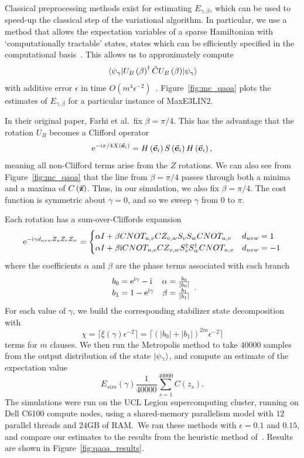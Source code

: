 Classical preprocessing methods exist for estimating $E_{\gamma,\beta}$, which can be used to speed-up the classical step of the variational algorithm. In particular, we use a method that allows the expectation variables of a sparse Hamiltonian with `computationally tractable' states, states which can be efficiently specified in the computational basis~\cite{VandenNest2009}. This allows us to approximately compute
\[\matrixel{\psi_{\gamma}}{U_{B}\left(\beta\right)^{\dagger} \hat{C}U_{B}\left(\beta\right)}{\psi_{\gamma}}\]
with additive error $\epsilon$ in time $O(m^{4}\epsilon^{-2})$~\cite{Bravyi2018}. Figure~\ref{fig:mc_qaoa} plots the estimates of $E_{\gamma,\beta}$ for a particular instance of MaxE3LIN2.\par
In their original paper, Farhi et al.\ fix $\beta=\pi/4$. This has the advantage that the rotation $U_{B}$ becomes a Clifford operator 
\[\mathrm{e}^{-\mathrm{i} \pi/4 X\left(\va{e}_{i}\right)}=H\left(\va{e}_{i}\right)S\left(\va{e}_{i}\right)H\left(\va{e}_{i}\right),\]
meaning all non-Clifford terms arise from the $Z$ rotations. We can also see from Figure~\ref{fig:mc_qaoa} that the line from $\beta=\pi/4$ passes through both a minima and a maxima of $C\left(\va{z}\right)$. Thus, in our simulation, we also fix $\beta=\pi/4$. The cost function is symmetric about $\gamma=0$, and so we sweep $\gamma$ from $0$ to $\pi$.\par
Each rotation has a sum-over-Cliffords expansion~\cite{Bravyi2018}
\[\mathrm{e}^{-\mathrm{i} \gamma d_{uvw}Z_{u}Z_{v}Z_{w}} = \begin{cases}
\alpha I + \beta CNOT_{u,v}CZ_{v,w}S_{v}S_{w}CNOT_{u,v} & d_{uvw} = 1\\
\alpha I + \beta \mathrm{i} CNOT_{u,v}CZ_{v,w}S^{\dagger}_{v}S^{\dagger}_{w}CNOT_{u,v} & d_{uvw} = -1\\
\end{cases}\]
where the coefficients $\alpha$ and $\beta$ are the phase terms associated with each branch
\[\begin{array}{lr}
b_{0} = \mathrm{e}^{\mathrm{i} \gamma}-\mathrm{i} & \alpha = \frac{b_{0}}{\left|b_{0}\right|}\\
b_{1} = 1 - \mathrm{e}^{\mathrm{i} \gamma} & \beta = \frac{b_{1}}{\left|b_{1}\right|}\\
\end{array}.\]
For each value of $\gamma$, we build the corresponding stabilizer state decomposition with
\[\chi = \lceil \xi\left(\gamma\right)\epsilon^{-2}\rceil = \lceil \left(\left|b_{0}\right|+\left|b_{1}\right|\right)^{2m}\epsilon^{-2}\rceil\]
terms for $m$ clauses. We then run the Metropolis method to take $40000$ samples from the output distribution of the state $\ket{\psi_{\gamma}}$, and compute an estimate of the expectation value
\begin{equation}
E_{sim}\left(\gamma\right)\frac{1}{40000}\sum_{s=1}^{40000}C\left(z_{s}\right).
\end{equation}
The simulations were run on the UCL Legion supercomputing cluster, running on Dell C6100 compute nodes, using a shared-memory parallelism model with $12$ parallel threads and $24\mathrm{GB}$ of RAM.\ We ran these methods with $\epsilon=0.1$ and $0.15$, and compare our estimates to the results from the heuristic method of~\cite{VandenNest2009}. Results are shown in Figure~\ref{fig:qaoa_results}.
